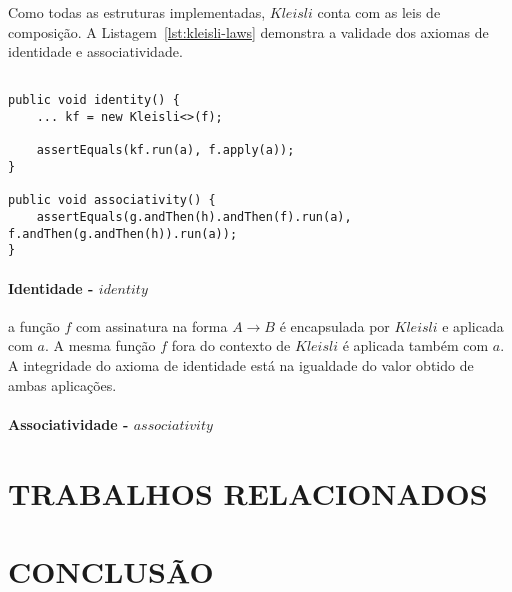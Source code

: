 \documentclass[10pt, conference]{IEEEtran}
\begin{document}
Como todas as estruturas implementadas, $Kleisli$ conta com as leis de composição. A Listagem~\ref{lst:kleisli-laws} demonstra a validade dos axiomas de identidade e associatividade.

\begin{lstlisting}[caption = {Leis de $Kleisli$}, label = {lst:kleisli-laws}]

public void identity() {
	... kf = new Kleisli<>(f);
	
	assertEquals(kf.run(a), f.apply(a));
}

public void associativity() {
	assertEquals(g.andThen(h).andThen(f).run(a), 							 f.andThen(g.andThen(h)).run(a));
}
\end{lstlisting}

\paragraph{Identidade - $identity$} a função $f$ com assinatura na forma $A \rightarrow B$ é encapsulada por $Kleisli$ e aplicada com $a$. A mesma função $f$ fora do contexto de $Kleisli$ é aplicada também com $a$. A integridade do axioma de identidade está na igualdade do valor obtido de ambas aplicações.

\paragraph{Associatividade - $associativity$} 

\section{TRABALHOS RELACIONADOS}

\section{CONCLUSÃO}



\end{document}
